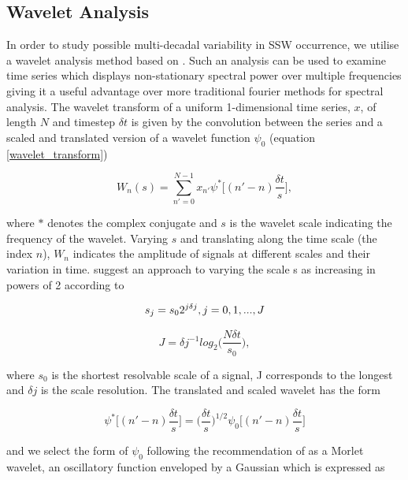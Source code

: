 \subsection{Wavelet Analysis}
\label{sec:Wavelet_Analysis}
In order to study possible multi-decadal variability in SSW occurrence, we utilise a wavelet analysis method based on \cite{Torrence1998}. Such an analysis can be used to examine time series which displays non-stationary spectral power over multiple frequencies \citep{Daubechies} giving it a useful advantage over more traditional fourier methods for spectral analysis. The wavelet transform of a uniform 1-dimensional time series, $x$, of length $N$ and timestep $\delta t$ is given by the convolution between the series and a scaled and translated version of a wavelet function $\psi_0$ (equation \ref{wavelet_transform})

\begin{equation} \label{wavelet_transform}
W_n(s) = \sum^{N - 1}_{n' = 0} x_{n'} \psi^* \bigg[(n' - n) \frac{\delta t}{s}\bigg],
\end{equation}

where $*$ denotes the complex conjugate and $s$ is the wavelet scale indicating the frequency of the wavelet. Varying $s$ and translating along the time scale (the index $n$), $W_n$ indicates the amplitude of signals at different scales and their variation in time. \cite{Torrence1998} suggest an approach to varying the scale s as increasing in powers of 2 according to 

\begin{equation} \label{S}
s_j = s_0 2^{j \delta j},\\ j = 0, 1, ..., J
\end{equation}

\begin{equation} \label{S}
J = \delta j^{-1} log_2\bigg(\frac{N \delta t}{s_0}\bigg),
\end{equation}

where $s_0$ is the shortest resolvable scale of a signal, J corresponds to the longest and $\delta j$ is the scale resolution. The translated and scaled wavelet has the form

\begin{equation} \label{wavelet}
\psi^* \bigg[(n' - n) \frac{\delta t}{s}\bigg] = \bigg(\frac{\delta t}{s}\bigg)^{1/2} \psi_0\bigg[(n' - n) \frac{\delta t}{s}\bigg]
\end{equation}

and we select the form of $\psi_0$ following the recommendation of \cite{Torrence1998} as a Morlet wavelet, an oscillatory function enveloped by a Gaussian which is expressed as

